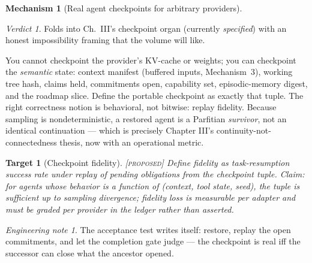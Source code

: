 \documentclass[11pt,a4paper]{article}
\newtheorem{target}{Target}[section]
\theoremstyle{definition}
\newtheorem{mech}{Mechanism}
\theoremstyle{remark}
\newtheorem*{verdict}{Verdict}
\newtheorem*{note}{Engineering note}
\newcommand{\grade}[1]{\textsc{[#1]}}
\begin{document}
\begin{mech}[Real agent checkpoints for arbitrary providers]
\begin{verdict} Folds into Ch.~III's checkpoint organ (currently \emph{specified}) with an honest impossibility framing that the volume will like. \end{verdict}
You cannot checkpoint the provider's KV-cache or weights; you can checkpoint the \emph{semantic} state: context manifest (buffered inputs, Mechanism~3), working tree hash, claims held, commitments open, capability set, episodic-memory digest, and the roadmap slice. Define the portable checkpoint as exactly that tuple. The right correctness notion is behavioral, not bitwise: replay fidelity. Because sampling is nondeterministic, a restored agent is a Parfitian \emph{survivor}, not an identical continuation --- which is precisely Chapter III's continuity-not-connectedness thesis, now with an operational metric.
\begin{target}[Checkpoint fidelity]\grade{proposed} Define fidelity as task-resumption success rate under replay of pending obligations from the checkpoint tuple. Claim: for agents whose behavior is a function of (context, tool state, seed), the tuple is sufficient up to sampling divergence; fidelity loss is measurable per adapter and must be graded per provider in the ledger rather than asserted. \end{target}
\begin{note} The acceptance test writes itself: restore, replay the open commitments, and let the completion gate judge --- the checkpoint is real iff the successor can close what the ancestor opened. \end{note}
\end{mech}
\end{document}
